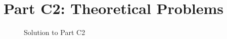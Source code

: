 \documentclass{report}
\begin{document}
\chapter{Part C2: Theoretical Problems}

\begin{figure}[h]
    \caption{Solution to Part C2}
    \label{fig:c2}
\end{figure}
\end{document}
